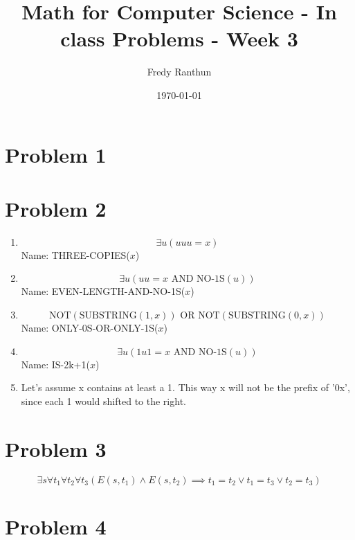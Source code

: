 \documentclass{article}
\title{Math for Computer Science - In class Problems - Week 3}
\author{Fredy Ranthun}
\date{\today}
\begin{document}
\maketitle

\section*{Problem 1}

\section*{Problem 2}
\begin{enumerate}[label=\alph*.]
  \setlength{\itemindent}{0pt}
  \item \[
          \exists u (uuu = x)
        \]
        Name: THREE-COPIES($x$)
  \item \[
          \exists u (uu = x \text{ AND } \text{NO-1S}(u))
        \]
        Name: EVEN-LENGTH-AND-NO-1S($x$)
  \item \[
          \text{NOT}(\text{SUBSTRING}(1,x)) \text{ OR } \text{NOT}(\text{SUBSTRING}(0,x))
        \]
        Name: ONLY-0S-OR-ONLY-1S($x$)
  \item \[
          \exists u (1u1 = x \text{ AND } \text{NO-1S}(u))
        \]
        Name: IS-2k+1($x$)
  \item Let's assume x contains at least a 1. This way x will not be the prefix of '0x',
        since each 1 would shifted to the right.
\end{enumerate}

\section*{Problem 3}

\[
  \exists s \forall t_1 \forall t_2 \forall t_3 \left(E(s, t_1) \land E(s, t_2) \implies t_1 = t_2 \lor t_1 = t_3 \lor t_2 = t_3 \right)
\]

\section*{Problem 4}
\end{document}
